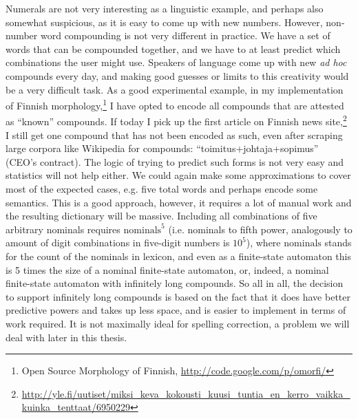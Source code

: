 \documentclass[officiallayout,final]{unihelcompling}
\begin{document}
Numerals are not very interesting as a linguistic example, and perhaps also
somewhat suspicious, as it is easy to come up with new numbers. However,
non-number word compounding is not very different in practice. We have a set of
words that can be compounded together, and we have to at least predict which
combinations the user might use. Speakers of language come up with new \emph{ad
hoc} compounds every day, and making good guesses or limits to this creativity
would be a very difficult task. As a good experimental example, in my
implementation of Finnish morphology,\footnote{Open Source Morphology of
Finnish, \url{http://code.google.com/p/omorfi/}} I have opted to encode all
compounds that are attested as ``known'' compounds. If today I pick up the
first article on Finnish news
site,\footnote{\url{http://yle.fi/uutiset/miksi_keva_kokousti_kuusi_tuntia_en_kerro_vaikka_kuinka_tenttaat/6950229}}
I still get one compound that has not been encoded as such, even after
\gls{scraping} large corpora like Wikipedia for compounds:
``toimitus+johtaja+sopimus'' (CEO's contract). The logic of trying to predict
such forms is not very easy and statistics will not help either. We could again
make some approximations to cover most of the expected cases, e.g. five total
words and perhaps encode some semantics. This is a good approach, however, it
requires a lot of manual work and the resulting dictionary will be massive.
Including all combinations of five arbitrary nominals requires
$\mathrm{nominals}^5$ (i.e. nominals to fifth power, analogously to amount of
digit combinations in five-digit numbers is $10^5$), where $\mathrm{nominals}$
stands for the count of the nominals in lexicon, and even as a finite-state
automaton this is 5 times the size of a nominal finite-state automaton, or,
indeed, a nominal finite-state automaton with infinitely long compounds. So all
in all, the decision to support infinitely long compounds is based on the fact
that it does have better predictive powers and takes up less space, and is
easier to implement in terms of work required.  It is not maximally ideal for
spelling correction, a problem we will deal with later in this thesis.
\end{document}
